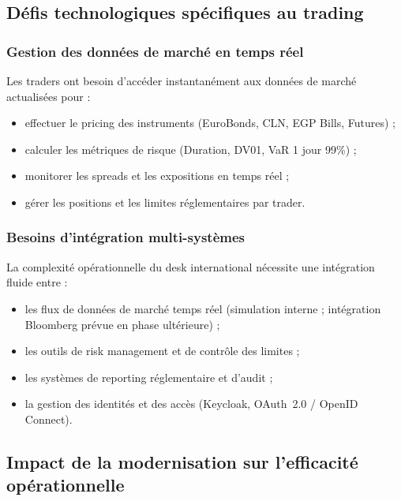 \subsection{Défis technologiques spécifiques au trading}

\subsubsection{Gestion des données de marché en temps réel}

\hspace{1cm} Les traders ont besoin d'accéder instantanément aux données de marché actualisées pour :

\begin{itemize}
    \item effectuer le pricing des instruments (EuroBonds, CLN, EGP Bills, Futures) ;
    \item calculer les métriques de risque (Duration, DV01, VaR 1 jour 99\%) ;
    \item monitorer les spreads et les expositions en temps réel ;
    \item gérer les positions et les limites réglementaires par trader.
\end{itemize}

\subsubsection{Besoins d'intégration multi-systèmes}

\hspace{1cm} La complexité opérationnelle du desk international nécessite une intégration fluide entre :

\begin{itemize}
    \item les flux de données de marché temps réel (simulation interne ; intégration Bloomberg prévue en phase ultérieure) ;
    \item les outils de risk management et de contrôle des limites ;
    \item les systèmes de reporting réglementaire et d'audit ;
    \item la gestion des identités et des accès (Keycloak, OAuth~2.0 / OpenID Connect).
\end{itemize}

\subsection{Impact de la modernisation sur l'efficacité opérationnelle}

